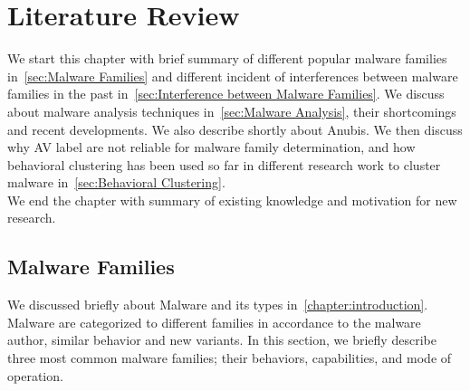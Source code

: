 \chapter{Literature Review}\label{chapter:literature_review}
We start this chapter with brief summary of different popular malware families in~\autoref{sec:Malware Families} and different incident of interferences between malware families in the past in~\autoref{sec:Interference between Malware Families}.
We discuss about malware analysis techniques in~\autoref{sec:Malware Analysis}, their shortcomings and recent developments.
We also describe shortly about Anubis.
We then discuss why AV label are not reliable for malware family determination, and how behavioral clustering has been used so far in different research work to cluster malware in~\autoref{sec:Behavioral Clustering}.\\
We end the chapter with summary of existing knowledge and motivation for new research.
\section{Malware Families}
\label{sec:Malware Families}
We discussed briefly about Malware and its types in~\autoref{chapter:introduction}.
Malware are categorized to different families in accordance to the malware author, similar behavior and new variants.
In this section, we briefly describe three most common malware families; their behaviors, capabilities, and mode of operation.\\
